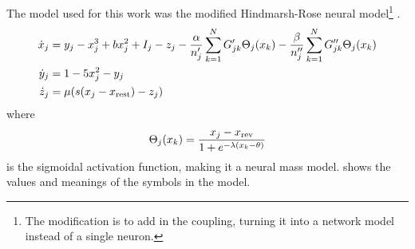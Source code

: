 The model used for this work was the modified Hindmarsh-Rose neural model\footnote{The modification is to add in the coupling, turning it into a network model instead of a single neuron.} \cite{Santos2017}.
\begin{align}
  \label{eq:hr_x}
  \dot{\hrx}_{j}
  &=
    \hry_{j}
    -
    \hrx_{j}^{3}
    +
    b \hrx_{j}^{2}
    +
    I_{j}
    -
    \hrz_{j}
    -
    \frac{\hra}{n'_{j}} \sum_{k = 1}^{N} G'_{j k} \Theta_{j}(\hrx_{k})
    -
    \frac{\hrb}{n''_{j}} \sum_{k = 1}^{N} G''_{j k} \Theta_{j}(\hrx_{k}) \\
  \label{eq:hr_y}
  \dot{\hry}_{j}
  &=
    1
    -
    5 \hrx_{j}^{2}
    -
    \hry_{j} \\
  \label{eq:hr_z}
  \dot{\hrz}_{j}
  &=
    \mu \pqty{s \pqty{\hrx_{j} - \hrx_{\text{rest}}} - \hrz_{j}}
\end{align}
where
\begin{equation}
  \label{eq:hr_sigmoid}
  \Theta_{j}(\hrx_{k})
  =
  \frac{\hrx_{j} - \hrx_{\text{rev}}}{1 + e^{-\lambda \pqty{\hrx_{k} - \theta}}}
\end{equation}
is the sigmoidal activation function, making it a neural mass model.
 shows the values and meanings of the symbols in the model.

